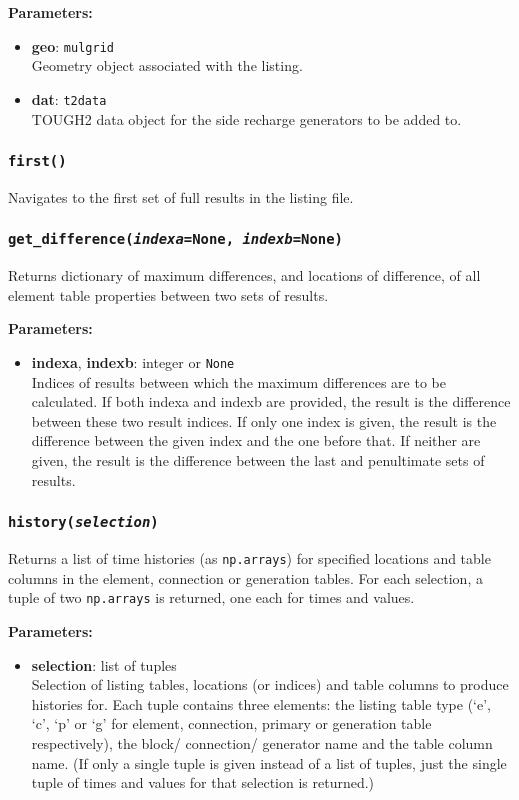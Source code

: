 \textbf{Parameters:}
\begin{itemize}
\item \textbf{geo}: \texttt{mulgrid}\\
  Geometry object associated with the listing.
\item \textbf{dat}: \texttt{t2data}\\
  TOUGH2 data object for the side recharge generators to be added to.
\end{itemize}

\subsubsection{\texttt{first()}}

Navigates to the first set of full results in the listing file.

\subsubsection{\texttt{get\_difference(\emph{indexa}=None, \emph{indexb}=None)}}

Returns dictionary of maximum differences, and locations of difference, of all element table properties between two sets of results.

\textbf{Parameters:}
\begin{itemize}
\item \textbf{indexa}, \textbf{indexb}: integer or \texttt{None}\\
  Indices of results between which the maximum differences are to be calculated.  If both indexa and indexb are provided, the result is the difference between these two result indices.  If only one index is given, the result is the difference between the given index and the one before that.  If neither are given, the result is the difference between the last and penultimate sets of results.
\end{itemize}

\subsubsection{\texttt{history(\emph{selection})}}

Returns a list of time histories (as \texttt{np.arrays}) for specified locations and table columns in the element, connection or generation tables.  For each selection, a tuple of two \texttt{np.arrays} is returned, one each for times and values.

\textbf{Parameters:}
\begin{itemize}
\item \textbf{selection}: list of tuples\\
  Selection of listing tables, locations (or indices) and table columns to produce histories for.  Each tuple contains three elements: the listing table type (`e', `c', `p' or `g' for element, connection, primary or generation table respectively), the block/ connection/ generator name and the table column name.  (If only a single tuple is given instead of a list of tuples, just the single tuple of times and values for that selection is returned.)
\end{itemize}

